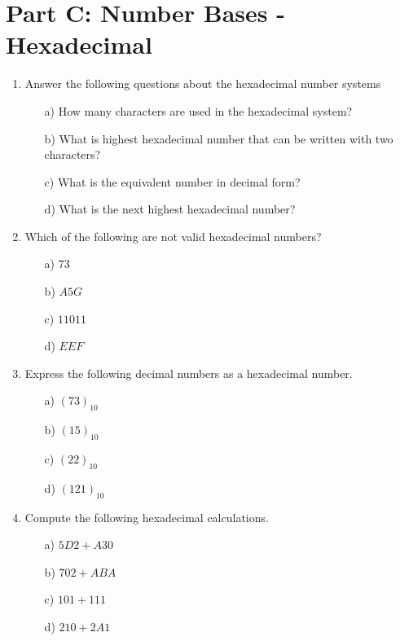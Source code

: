 \documentclass[]{report}
\begin{document}
\section*{Part C: Number Bases - Hexadecimal}
\begin{enumerate}

\item Answer the following questions about the hexadecimal number systems
\begin{itemize}
\item[a)] How many characters are used in the hexadecimal system?
\item[b)] What is highest hexadecimal number that can be written with two characters? \item[c)] What is the equivalent number in decimal form?
\item[d)] What is the next highest hexadecimal number?
\end{itemize}


\item Which of the following are not valid hexadecimal numbers?
\begin{multicols}{4}
\begin{itemize}
\item[a)] $73$
\item[b)] $A5G$
\item[c)] $11011$
\item[d)] $EEF$
\end{itemize}
\end{multicols}

\item Express the following decimal numbers as a hexadecimal number.
\begin{multicols}{4}
\begin{itemize}
\item[a)] $(73)_{10}$
\item[b)] $(15)_{10}$
\item[c)] $(22)_{10}$
\item[d)] $(121)_{10}$
\end{itemize}
\end{multicols}


\item Compute the following hexadecimal calculations.
\begin{multicols}{4}
\begin{itemize}
\item[a)] $5D2+A30$
\item[b)] $702+ABA$
\item[c)] $101+111$
\item[d)] $210+2A1$
\end{itemize}
\end{multicols}
\end{enumerate}
\end{document}
